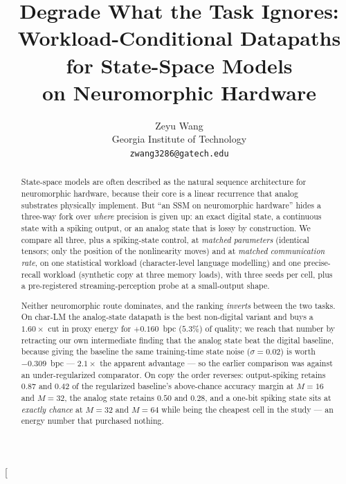 \documentclass[10pt,twocolumn]{article}
\title{Degrade What the Task Ignores:\\
Workload-Conditional Datapaths for State-Space Models\\
on Neuromorphic Hardware}
\author{Zeyu Wang\\
Georgia Institute of Technology\\
\texttt{zwang3286@gatech.edu}}
\date{}
\begin{document}
\makeatletter
\twocolumn[
\begin{@twocolumnfalse}
\maketitle
\begin{abstract}
State-space models are often described as the natural sequence architecture for neuromorphic
hardware, because their core is a linear recurrence that analog substrates physically implement.
But ``an SSM on neuromorphic hardware'' hides a three-way fork over \emph{where} precision is
given up: an exact digital state, a continuous state with a spiking output, or an analog state
that is lossy by construction. We compare all three, plus a spiking-state control, at
\emph{matched parameters} (identical tensors; only the position of the nonlinearity moves) and at
\emph{matched communication rate}, on one statistical workload (character-level language
modelling) and one precise-recall workload (synthetic copy at three memory loads), with three
seeds per cell, plus a pre-registered streaming-perception probe at a small-output shape.

Neither neuromorphic route dominates, and the ranking \emph{inverts} between the two tasks. On
char-LM the analog-state datapath is the best non-digital variant and buys a $1.60\times$ cut in
proxy energy for $+0.160$~bpc ($5.3\%$) of quality; we reach that number by retracting our own
intermediate finding that the analog state beat the digital baseline, because giving the baseline
the same training-time state noise ($\sigma{=}0.02$) is worth $-0.309$~bpc --- $2.1\times$ the
apparent advantage --- so the earlier comparison was against an under-regularized comparator. On
copy the order reverses: output-spiking retains $0.87$ and $0.42$ of the regularized baseline's
above-chance accuracy margin at $M{=}16$ and $M{=}32$, the analog state retains $0.50$ and
$0.28$, and a one-bit spiking state sits at \emph{exactly chance} at $M{=}32$ and $M{=}64$ while
being the cheapest cell in the study --- an energy number that purchased nothing.


\end{abstract}
\end{@twocolumnfalse}
\end{document}
